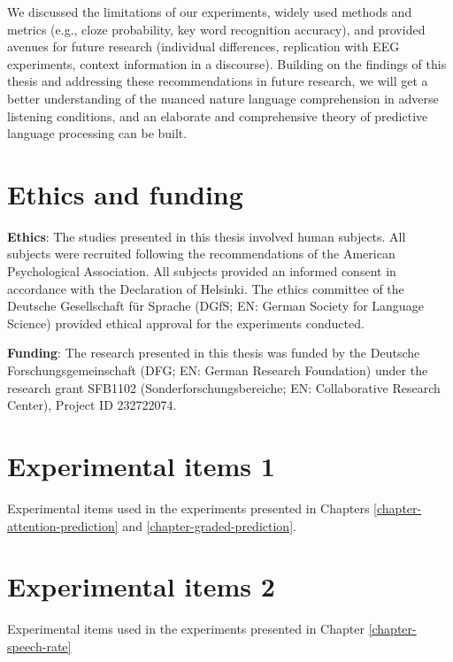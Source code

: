 \documentclass[a4paper, nobind]{templates/ociamthesis}
\begin{document}
We discussed the limitations of our experiments, widely used methods and metrics (e.g., cloze probability, key word recognition accuracy),
and provided avenues for future research (individual differences, replication with EEG experiments, context information in a discourse).
Building on the findings of this thesis and addressing these recommendations in future research,
we will get a better understanding of the nuanced nature language comprehension in adverse listening conditions,
and an elaborate and comprehensive theory of predictive language processing can be built.

\hypertarget{chapter-ethics}{%
\chapter{Ethics and funding}\label{chapter-ethics}}

\noindent 

\textbf{Ethics}: The studies presented in this thesis involved human subjects.
All subjects were recruited following the recommendations of the American Psychological Association.
All subjects provided an informed consent in accordance with the Declaration of Helsinki.
The ethics committee of the Deutsche Gesellschaft für Sprache (DGfS; EN: German Society for Language Science) provided ethical approval for the experiments conducted.

\textbf{Funding}: The research presented in this thesis was funded by the Deutsche Forschungsgemeinschaft (DFG; EN: German Research Foundation) under the research grant SFB1102 (Sonderforschungsbereiche; EN: Collaborative Research Center), Project ID 232722074.

\startappendices

\hypertarget{experimental-items-1}{%
\chapter{Experimental items 1}\label{experimental-items-1}}

Experimental items used in the experiments presented in Chapters \ref{chapter-attention-prediction} and \ref{chapter-graded-prediction}.

\hypertarget{experimental-items-2}{%
\chapter{Experimental items 2}\label{experimental-items-2}}

Experimental items used in the experiments presented in Chapter \ref{chapter-speech-rate}
\end{document}
